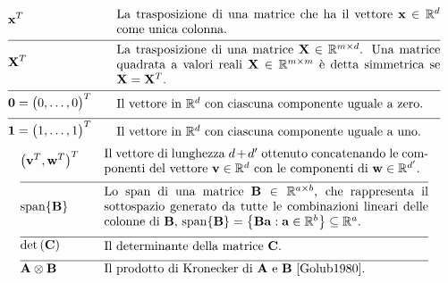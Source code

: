 \begin{align}
	&\featurevec^{T} &\quad & \parbox{.75\textwidth}{La trasposizione di una matrice che ha il vettore
		$\featurevec \in \mathbb{R}^{\dimlocalmodel}$ come unica colonna.} \nonumber \\[2mm] \hline \nonumber\\[-5mm]
	&\mathbf{X}^{T} &\quad & \parbox{.75\textwidth}{La trasposizione di una matrice $\mathbf{X} \in \mathbb{R}^{\samplesize \times \featurelen}$. 
		Una matrice quadrata a valori reali $\mathbf{X} \in \mathbb{R}^{\samplesize \times \samplesize}$ 
		è detta simmetrica se $\mathbf{X} = \mathbf{X}^{T}$. }  \nonumber \\[2mm] \hline \nonumber\\[-5mm]
	&\mathbf{0}= \big(0,\ldots,0\big)^{T}  & \quad &  \parbox{.75\textwidth}{Il vettore in $\mathbb{R}^{\dimlocalmodel}$ con ciascuna componente uguale a zero.} \nonumber \\[2mm] \hline \nonumber\\[-5mm]
	&\mathbf{1}= \big(1,\ldots,1\big)^{T}  & \quad &  \parbox{.75\textwidth}{Il vettore in $\mathbb{R}^{\dimlocalmodel}$ con ciascuna componente uguale a uno.} \nonumber
\end{align} 
\newpage
\begin{align} 
	&\big(\vv^{T},\vw^{T} \big)^{T}  & \quad &  \parbox{.75\textwidth}{Il vettore di lunghezza $\featurelen+\featurelen'$ 
		ottenuto concatenando le componenti del vettore $\vv \in \mathbb{R}^{\featurelen}$ con le componenti di $\vw \in \mathbb{R}^{\featurelen'}$.} \nonumber \nonumber \\[2mm] \hline \nonumber\\[-5mm]
	&	{\rm span}\{ \mathbf{B} \}  & \quad &  \parbox{.75\textwidth}{Lo span di una matrice $\mathbf{B} \in \mathbb{R}^{a \times b}$, 
		che rappresenta il sottospazio generato da tutte le combinazioni lineari delle colonne di $\mathbf{B}$, 
		${\rm span}\{ \mathbf{B} \} = \big\{  \mathbf{B} \va : \va \in \mathbb{R}^{b} \big\} \subseteq \mathbb{R}^{a}$.}\nonumber \\[2mm] \hline \nonumber\\[-5mm]
	&\determinant{\mC} &\quad & \parbox{.75\textwidth}{Il determinante della matrice $\mC$. } \nonumber \\[2mm] \hline \nonumber\\[-5mm]
	&\mathbf{A} \otimes \mathbf{B} &\quad & \parbox{.75\textwidth}{Il prodotto di Kronecker di $\mathbf{A}$ e $\mathbf{B}$ \cite{Golub1980}. }  \nonumber
\end{align} 

